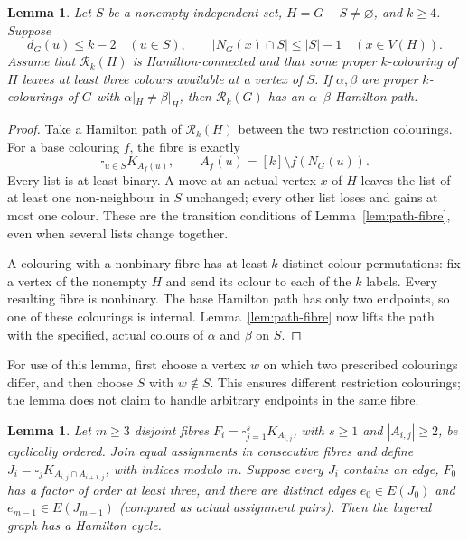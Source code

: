 \documentclass[11pt]{article}
\newtheorem{lemma}[theorem]{Lemma}
\theoremstyle{remark}
\newcommand{\Rk}{\mathcal R_k}
\numberwithin{equation}{section}
\numberwithin{table}{section}
\begin{document}
\begin{lemma}
\label{lem:independent-hc}
Let $S$ be a nonempty independent set, $H=G-S\ne\varnothing$, and
$k\ge4$.  Suppose
\[
 d_G(u)\le k-2\quad(u\in S),\qquad
 |N_G(x)\cap S|\le |S|-1\quad(x\in V(H)).
\]
Assume that $\Rk(H)$ is Hamilton-connected and that some proper
$k$-colouring of $H$ leaves at least three colours available at a vertex
of $S$.  If $\alpha,\beta$ are proper $k$-colourings of $G$ with
$\alpha|_H\ne\beta|_H$, then $\Rk(G)$ has an
$\alpha$--$\beta$ Hamilton path.
\end{lemma}

\begin{proof}
Take a Hamilton path of $\Rk(H)$ between the two restriction
colourings.  For a base colouring $f$, the fibre is exactly
\[
 \square_{u\in S}K_{A_f(u)},\qquad
 A_f(u)=[k]\setminus f(N_G(u)).
\]
Every list is at least binary.  A move at an actual vertex $x$ of $H$
leaves the list of at least one non-neighbour in $S$ unchanged; every
other list loses and gains at most one colour.  These are the transition
conditions of Lemma~\ref{lem:path-fibre}, even when several lists
change together.

A colouring with a nonbinary fibre has at least $k$ distinct colour
permutations: fix a vertex of the nonempty $H$ and send its colour to
each of the $k$ labels.  Every resulting fibre is nonbinary.  The base
Hamilton path has only two endpoints, so one of these colourings is
internal.  Lemma~\ref{lem:path-fibre} now lifts the path with the
specified, actual colours of $\alpha$ and $\beta$ on $S$.
\end{proof}

For use of this lemma, first choose a vertex $w$ on which two prescribed
colourings differ, and then choose $S$ with $w\notin S$.  This ensures
different restriction colourings; the lemma does not claim to handle
arbitrary endpoints in the same fibre.

\begin{lemma}
\label{lem:fibre-lift}
Let $m\ge3$ disjoint fibres
$F_i=\square_{j=1}^sK_{A_{i,j}}$, with $s\ge1$ and
$|A_{i,j}|\ge2$, be cyclically ordered.  Join equal assignments in
consecutive fibres and define
$J_i=\square_j K_{A_{i,j}\cap A_{i+1,j}}$, with indices modulo $m$.
Suppose every $J_i$ contains an edge, $F_0$ has a factor of order at
least three, and there are distinct edges
$e_0\in E(J_0)$ and $e_{m-1}\in E(J_{m-1})$ (compared as actual
assignment pairs).  Then the layered graph has a Hamilton cycle.
\end{lemma}
\end{document}
